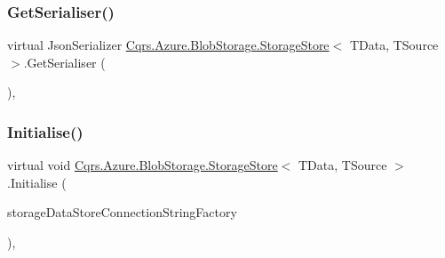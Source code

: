 \mbox{\label{classCqrs_1_1Azure_1_1BlobStorage_1_1StorageStore_acca953271229a19433db9c38c85b5b9e_acca953271229a19433db9c38c85b5b9e}} 
\subsubsection{\texorpdfstring{Get\+Serialiser()}{GetSerialiser()}}
{\footnotesize\ttfamily virtual Json\+Serializer \hyperlink{classCqrs_1_1Azure_1_1BlobStorage_1_1StorageStore}{Cqrs.\+Azure.\+Blob\+Storage.\+Storage\+Store}$<$ T\+Data, T\+Source $>$.Get\+Serialiser (\begin{DoxyParamCaption}{ }\end{DoxyParamCaption})\hspace{0.3cm}{\ttfamily [protected]}, {\ttfamily [virtual]}}

\mbox{\label{classCqrs_1_1Azure_1_1BlobStorage_1_1StorageStore_a8d16603267a768190f2c49ca3d1c439e_a8d16603267a768190f2c49ca3d1c439e}} 
\subsubsection{\texorpdfstring{Initialise()}{Initialise()}}
{\footnotesize\ttfamily virtual void \hyperlink{classCqrs_1_1Azure_1_1BlobStorage_1_1StorageStore}{Cqrs.\+Azure.\+Blob\+Storage.\+Storage\+Store}$<$ T\+Data, T\+Source $>$.Initialise (\begin{DoxyParamCaption}\item[{\hyperlink{interfaceCqrs_1_1Azure_1_1BlobStorage_1_1IStorageStoreConnectionStringFactory}{I\+Storage\+Store\+Connection\+String\+Factory}}]{storage\+Data\+Store\+Connection\+String\+Factory }\end{DoxyParamCaption})\hspace{0.3cm}{\ttfamily [protected]}, {\ttfamily [virtual]}}




